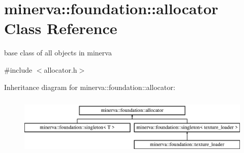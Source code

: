 \hypertarget{classminerva_1_1foundation_1_1allocator}{}\section{minerva\+:\+:foundation\+:\+:allocator Class Reference}
\label{classminerva_1_1foundation_1_1allocator}


base class of all objects in minerva  




{\ttfamily \#include $<$allocator.\+h$>$}

Inheritance diagram for minerva\+:\+:foundation\+:\+:allocator\+:\begin{figure}[H]
\begin{center}
\leavevmode
\includegraphics[height=2.886598cm]{classminerva_1_1foundation_1_1allocator}
\end{center}
\end{figure}
